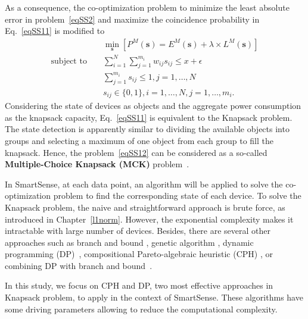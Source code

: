 As a consequence, the co-optimization problem to minimize the least absolute error in problem~\eqref{eqSS2} and maximize the coincidence probability in Eq.~\eqref{eqSS11} is modified to
\begin{eqnarray}\label{eqSS12}
&&\min_{\mathbf{s}}{\left[P^M(\mathbf{s}) = E^M(\mathbf{s}) + \lambda \times L^M(\mathbf{s})\right]} \\
\mbox{subject to } &&\sum_{i=1}^N{\sum_{j=1}^{m_i}{w_{ij}s_{ij}}}\leq x+\epsilon \nonumber\\
&& \sum_{j=1}^{m_i}{s_{ij}} \leq 1, j=1,\ldots,N \nonumber\\
&&s_{ij}\in \{0,1\},  i=1,\ldots ,N,j=1,\ldots,m_i.\nonumber
\end{eqnarray}
Considering the state of devices as objects and the aggregate power consumption as the knapsack capacity, Eq.~\eqref{eqSS11} is equivalent to the Knapsack problem. The state detection is apparently similar to dividing the available objects into groups and selecting a maximum of one object from each group to fill the knapsack. Hence, the problem~\eqref{eqSS12} can be considered as a so-called \textbf{Multiple-Choice Knapsack (MCK)} problem~\cite{Bean88}.

In SmartSense, at each data point, an algorithm will be applied to solve the co-optimization problem to find the corresponding state of each device. To solve the Knapsack problem, the naive and straightforward approach is brute force, as introduced in Chapter~\ref{l1norm}. However, the exponential complexity makes it intractable with large number of devices. Besides, there are several other approaches such as branch and bound \cite{Martello1980276,DYER1984231,Lukata1997}, genetic algorithm \cite{Anagun2006,Singh07,Fukunaga08,Shen11}, dynamic programming (DP)~\cite{Toth79,Bean88}, compositional Pareto-algebraic heuristic (CPH) \cite{Shojaei13,Shojaei5227146,Geilen07,Geilen05,Geilen07acm,Hifi04,Yukish2004}, or combining DP with branch and bound~\cite{Martello99}.

In this study, we focus on CPH and DP, two most effective approaches in Knapsack problem, to apply in the context of SmartSense. These algorithms have some driving parameters allowing to reduce the computational complexity.
